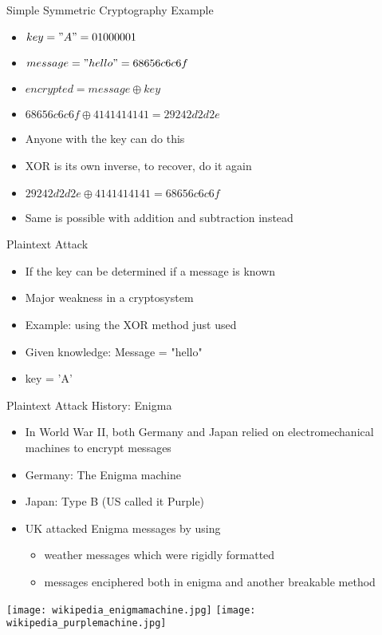 \begin{frame}{Simple Symmetric Cryptography Example}
\begin{itemize}
    \item $key = "A" = 01000001$
    \item $message = "hello" = 68 65 6c 6c 6f$ 
    \item $encrypted = message \oplus key$
    \item $68 65 6c 6c 6f \oplus 41 41 41 41 41 = 29 24 2d 2d 2e$
    \item Anyone with the key can do this
    \item XOR is its own inverse, to recover, do it again
    \item $29 24 2d 2d 2e \oplus 41 41 41 41 41 = 68 65 6c 6c 6f$
    \item Same is possible with addition and subtraction instead 
\end{itemize}
\end{frame}

\begin{frame}{Plaintext Attack}
\begin{itemize}
    \item If the key can be determined if a message is known
    \item Major weakness in a cryptosystem
    \item Example: using the XOR method just used
    \item Given knowledge: Message = "hello"
    \item key = 'A'
\end{itemize}
\end{frame}

\begin{frame}{Plaintext Attack History: Enigma}
\begin{itemize}
    \item In World War II, both Germany and Japan relied on electromechanical machines to encrypt messages
    \item Germany: The Enigma machine
    \item Japan: Type B (US called it Purple)
    \item UK attacked Enigma messages by using
    \begin{itemize} 
        \item weather messages which were rigidly formatted
        \item messages enciphered both in enigma and another breakable method
    \end{itemize}
\end{itemize}
\texttt{[image: wikipedia\_enigmamachine.jpg]}
\texttt{[image: wikipedia\_purplemachine.jpg]}
\end{frame}

